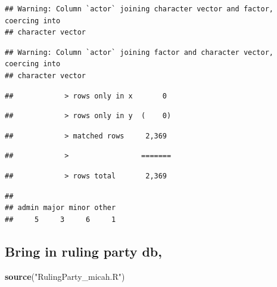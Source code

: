 \documentclass[]{article}
\newenvironment{Shaded}{\begin{snugshade}}{\end{snugshade}}
\newcommand{\KeywordTok}[1]{\textcolor[rgb]{0.13,0.29,0.53}{\textbf{#1}}}
\newcommand{\NormalTok}[1]{#1}
\newcommand{\OperatorTok}[1]{\textcolor[rgb]{0.81,0.36,0.00}{\textbf{#1}}}
\newcommand{\StringTok}[1]{\textcolor[rgb]{0.31,0.60,0.02}{#1}}
\begin{document}
\begin{verbatim}
## Warning: Column `actor` joining character vector and factor, coercing into
## character vector
\end{verbatim}

\begin{verbatim}
## Warning: Column `actor` joining factor and character vector, coercing into
## character vector
\end{verbatim}

\begin{verbatim}
##            > rows only in x       0
\end{verbatim}

\begin{verbatim}
##            > rows only in y  (    0)
\end{verbatim}

\begin{verbatim}
##            > matched rows     2,369
\end{verbatim}

\begin{verbatim}
##            >                 =======
\end{verbatim}

\begin{verbatim}
##            > rows total       2,369
\end{verbatim}

\begin{Shaded}
\end{Shaded}

\begin{verbatim}
## 
## admin major minor other 
##     5     3     6     1
\end{verbatim}

\hypertarget{bring-in-ruling-party-db}{%
\subsection{Bring in ruling party db,}\label{bring-in-ruling-party-db}}

\begin{Shaded}
\begin{Highlighting}[]
\KeywordTok{source}\NormalTok{(}\StringTok{"RulingParty_micah.R"}\NormalTok{)}
\end{Highlighting}
\end{Shaded}
\end{document}

